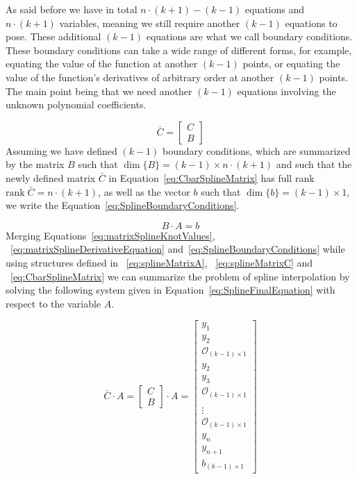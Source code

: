 \documentclass[12pt, a4paper]{article}
\begin{document}
As said before we have in total \(n\cdot(k+1)-(k-1)\) equations and \( n\cdot(k+1) \) variables, meaning we still require another $(k-1)$  equations to pose. These additional $(k-1)$ equations are what we call boundary conditions. These boundary conditions can take a wide range of different forms, for example, equating the value of the function at another $(k-1)$ points, or equating the value of the function's derivatives of arbitrary order at another $(k-1)$ points. The main point being that we need another $(k-1)$ equations involving the unknown polynomial coefficients.\par
\begin{equation} \label{eq:CbarSplineMatrix}
    \bar{C} = \begin{bmatrix}
    C\\
    B
    \end{bmatrix}
\end{equation}
Assuming we have defined $(k-1)$ boundary conditions, which are summarized by the matrix $B$ such that $\dim\{B\} = (k-1)\times n\cdot (k+1)$ and such that the newly defined matrix $\bar{C}$ in Equation~\eqref{eq:CbarSplineMatrix} has full rank $\text{rank}\; \bar{C} = n \cdot (k+1)$, as well as the vector $b$ such that $\dim \{b\} = (k-1)\times 1$, we write the Equation~\eqref{eq:SplineBoundaryConditions}. \par
\begin{equation} \label{eq:SplineBoundaryConditions}
    B \cdot A = b
\end{equation}
Merging Equations~\eqref{eq:matrixSplineKnotValues}, ~\eqref{eq:matrixSplineDerivativeEquation} and~\eqref{eq:SplineBoundaryConditions} while using structures defined in ~\eqref{eq:splineMatrixA}, ~\eqref{eq:splineMatrixC} and ~\eqref{eq:CbarSplineMatrix} we can summarize the problem of spline interpolation by solving the following system given in Equation~\eqref{eq:SplineFinalEquation} with respect to the variable $A$.\par
\begin{equation} \label{eq:SplineFinalEquation}
    \bar{C} \cdot A
    =
    \begin{bmatrix}
    C\\
    B
    \end{bmatrix}
    \cdot
    A
    =
    \begin{bmatrix}
    y_1\\
    y_2\\
    \mathcal{O}_{(k-1)\times 1}\\
    y_2\\
    y_3\\
    \mathcal{O}_{(k-1)\times 1}\\
    \\
    \vdots
    \\
    \mathcal{O}_{(k-1)\times 1}\\
    y_n\\
    y_{n+1}\\
    b_{(k-1)\times 1}
    \end{bmatrix}
\end{equation}
\end{document}
